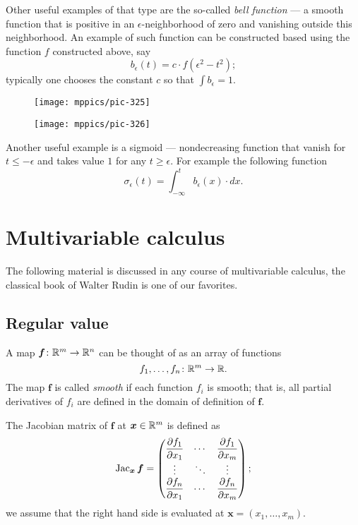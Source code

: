 Other useful examples of that type are the so-called \emph{bell function} --- a smooth function that is positive in an $\epsilon$-neighborhood of zero and vanishing outside this neighborhood.
An example of such function can be constructed based using the function $f$ constructed above, say 
\[b_\epsilon(t)=c\cdot f(\epsilon^2-t^2);\]
typically one chooses the constant $c$ so that $\int b_\epsilon=1$.

\begin{figure}[h!]
\begin{minipage}{.48\textwidth}
\centering
\texttt{[image: mppics/pic-325]}
\end{minipage}\hfill
\begin{minipage}{.48\textwidth}
\centering
\texttt{[image: mppics/pic-326]}
\end{minipage}
\end{figure}

Another useful example is a sigmoid --- nondecreasing function that vanish for $t\le -\epsilon$ and takes value $1$ for any $t\ge \epsilon$.
For example the following function \label{page:sigma-function}
\[\sigma_\epsilon(t)
=
\int_{-\infty}^t b_\epsilon(x)\cdot dx.\]



\section{Multivariable calculus}

The following material is discussed in any course of multivariable calculus, the classical book of Walter Rudin \cite{rudin} is one of our favorites.

\subsection*{Regular value}

A map $\bm{f}\colon\mathbb{R}^m\to\mathbb{R}^n$ can be thought of as an array of functions 
\[f_1,\dots,f_n\colon\mathbb{R}^m\to \mathbb{R}.\]
The map $\bm{f}$ is called \emph{smooth} if each function $f_i$ is smooth;
that is, all partial derivatives of $f_i$ are defined in the domain of definition of $\bm{f}$.

The Jacobian matrix of $\bm{f}$ at $\bm{x}\in\mathbb{R}^m$ is defined as
\[\mathop{\rm Jac}\nolimits_{\bm{x}}\bm{f}=
\begin{pmatrix}
\dfrac{\partial f_1}{\partial x_1} & \cdots & \dfrac{\partial f_1}{\partial x_m}\\
\vdots & \ddots & \vdots\\
\dfrac{\partial f_n}{\partial x_1} & \cdots & \dfrac{\partial f_n}{\partial x_m} \end{pmatrix};\]
we assume that the right hand side is evaluated at $\bm{x}=(x_1,\dots,x_m)$.

